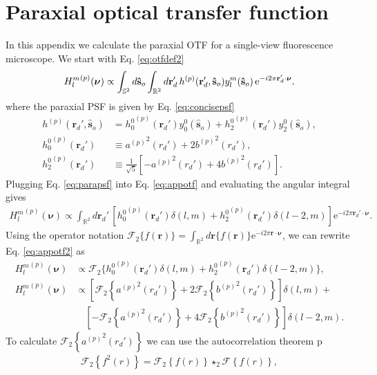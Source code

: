 \documentclass[11pt]{article}
\newcommand{\me}{\mathrm{e}}
\providecommand{\mb}[1]{\mathbf{#1}}
\providecommand{\so}[1]{\mathbf{\hat{s}}_o}
\providecommand{\rd}[1]{\mathbf{r}_d}
\providecommand{\bs}[1]{\boldsymbol{#1}}
\begin{document}
\section{Paraxial optical transfer function}\label{paraxialotf2}    
In this appendix we calculate the paraxial OTF for a single-view fluorescence
microscope. We start with Eq. \ref{eq:otfdef2}
\begin{align}
  {H_l^m}^{(p)}(\bs{\nu}) \propto \int_{\mathbb{S}^2}d\so{}\int_{\mathbb{R}^2}d\rd{}'\, h^{(p)}(\rd{}', \so{}) y_l^m(\so{})\thinspace\me^{-i 2\pi \rd{}'\cdot\bs{\nu}}.
  \label{eq:appotf}
\end{align}
where the paraxial PSF is given by Eq. \ref{eq:concisepsf}
\begin{align}
  h^{(p)}(\rd{}', \so{}) &= {h_0^0}^{(p)}(\rd{}')y_0^0(\so{}) + {h_2^0}^{(p)}(\rd{}')y_2^0(\so{}),\\ \label{eq:parapsf}
  {h_0^0}^{(p)}(\rd{}') &\equiv {a^{(p)}}^2(r_d') + 2{b^{(p)}}^2(r_d'),\\
  {h_2^0}^{(p)}(\rd{}') &\equiv \frac{1}{\sqrt{5}}\left[- {a^{(p)}}^2(r_d') + 4{b^{(p)}}^2(r_d')\right]. 
\end{align}
Plugging Eq. \ref{eq:parapsf} into Eq. \ref{eq:appotf} and evaluating the
angular integral gives
\begin{align}
  {H_l^m}^{(p)}(\bs{\nu}) \propto \int_{\mathbb{R}^2}d\rd{}'\, \left[{h_0^0}^{(p)}(\rd{}')\delta(l, m) + {h_2^0}^{(p)}(\rd{}')\delta(l-2, m)\right] \me^{-i 2\pi \rd{}'\cdot\bs{\nu}}. \label{eq:appotf2}
\end{align}
Using the operator notation $\mathcal{F}_2\{f(\mb{r})\} = \int_{\mathbb{R}^2}d\mb{r}\{f(\mb{r})\}\me^{-i 2\pi \mb{r}\cdot\bs{\nu}}$, we can rewrite Eq. \ref{eq:appotf2} as 
\begin{align}
  {H_l^m}^{(p)}(\bs{\nu}) &\propto \mathcal{F}_2\{{h_0^0}^{(p)}(\rd{}')\delta(l, m) + {h_2^0}^{(p)}(\rd{}')\delta(l-2, m) \},\\
  {H_l^m}^{(p)}(\bs{\nu}) &\propto \left[\mathcal{F}_2\left\{{a^{(p)}}^2(r_d')\right\} + 2\mathcal{F}_2\left\{{b^{(p)}}^2(r_d')\right\}\right]\delta(l, m) + \\&\hspace{1em}\left[-\mathcal{F}_2\left\{{a^{(p)}}^2(r_d')\right\} + 4\mathcal{F}_2\left\{{b^{(p)}}^2(r_d')\right\}\right]\delta(l-2, m).
\end{align}
To calculate $\mathcal{F}_2\left\{{a^{(p)}}^2(r_d')\right\}$ we can use the
autocorrelation theorem \cite{goodman1996}
p\begin{align}
  \mathcal{F}_2\left\{f^2(r)\right\} = \mathcal{F}_2\left\{f(r)\right\} \star_2 \mathcal{F}\left\{f(r)\right\},
\end{align}
\end{document}
